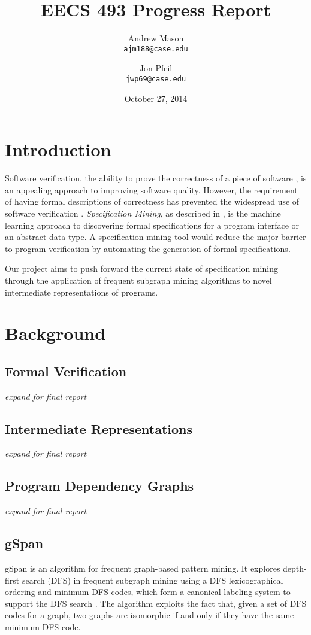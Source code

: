 \documentclass[12pt]{article}
\title{EECS 493 Progress Report}
\author{
    Andrew Mason\\
    \texttt{ajm188@case.edu}
    \and
    Jon Pfeil\\
    \texttt{jwp69@case.edu}
}
\date{October 27, 2014}
\begin{document}
\maketitle
\tableofcontents
\pagebreak

\section{Introduction}
Software verification, the ability to prove the correctness of a piece of software \cite{FormalSoftwareVerification}, is an appealing approach to improving software quality. However, the requirement of having formal descriptions of correctness has prevented the widespread use of software verification \cite{MiningSpecifications}. \textit{Specification Mining}, as described in \cite{MiningSpecifications}, is the machine learning approach to discovering formal specifications for a program interface or an abstract data type. A specification mining tool would reduce the major barrier to program verification by automating the generation of formal specifications.

Our project aims to push forward the current state of specification mining through the application of frequent subgraph mining algorithms to novel intermediate representations of programs.

\section{Background}
\label{section:Background}
\subsection{Formal Verification}
\textit{expand for final report}

\subsection{Intermediate Representations}
\textit{expand for final report}

\subsection{Program Dependency Graphs}
\textit{expand for final report}

\subsection{gSpan}
\label{subsection:gSpan}
gSpan is an algorithm for frequent graph-based pattern mining. It explores depth-first  search (DFS) in frequent subgraph mining using a DFS lexicographical ordering and minimum DFS codes, which form a canonical labeling system to support the DFS search \cite{Yan:2002:GGS:844380.844811}. The algorithm exploits the fact that, given a set of DFS codes for a graph, two graphs are isomorphic if and only if they have the same minimum DFS code.
\end{document}
